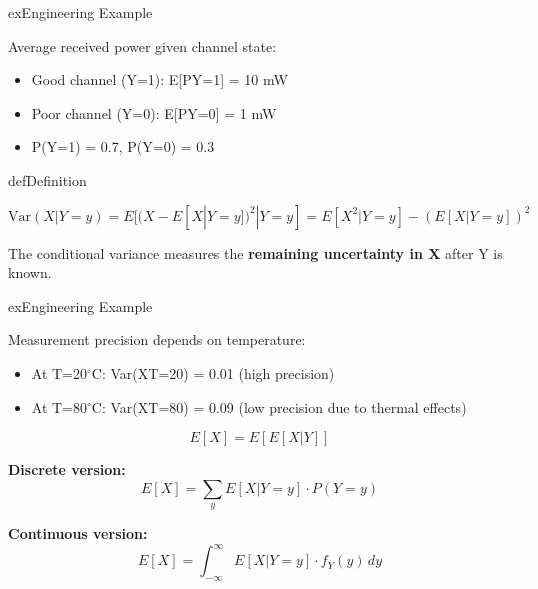 \begin{PSbox}[unbreakable]{ex}{Engineering Example}

Average received power given channel state:

\begin{itemize}
\tightlist
\item
  Good channel (Y=1): E[P\textbar{}Y=1] = 10 mW
\item
  Poor channel (Y=0): E[P\textbar{}Y=0] = 1 mW
\item
  P(Y=1) = 0.7, P(Y=0) = 0.3
\end{itemize}

\end{PSbox}


\begin{PSbox}[unbreakable]{def}{Definition}

\[\text{Var}(X|Y=y) = E[(X - E[X|Y=y])^2 | Y=y] = E[X^2|Y=y] - (E[X|Y=y])^2\]

\end{PSbox}


The conditional variance measures the \textbf{remaining uncertainty in X} after Y is known.

\begin{PSbox}[unbreakable]{ex}{Engineering Example}

Measurement precision depends on temperature:

\begin{itemize}
\tightlist
\item
  At T=20\ensuremath{^{\circ}}C: Var(X\textbar{}T=20) = 0.01 (high precision)
\item
  At T=80\ensuremath{^{\circ}}C: Var(X\textbar{}T=80) = 0.09 (low precision due to thermal effects)
\end{itemize}

\end{PSbox}



\[E[X] = E[E[X|Y]]\]

\textbf{Discrete version:}\PSbr{}\[E[X] = \sum_y E[X|Y=y] \cdot P(Y=y)\]

\textbf{Continuous version:}\PSbr{}\[E[X] = \int_{-\infty}^{\infty} E[X|Y=y] \cdot f_Y(y) \, dy\]


